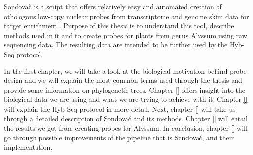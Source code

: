 Sondovač is a script that offers relatively easy and automated creation of othologous low-copy nuclear probes from 
transcriptome and genome skim data for target enrichment \cite{sondovac}. Purpose of this thesis is to understand 
this tool, describe methods used in it and to create probes for plants from genus Alyssum using raw sequencing data. 
The resulting data are intended to be further used by the Hyb-Seq protocol. 

In the first chapter, we will take a look at the biological motivation behind probe design and we will explain the most 
common terms used through the thesis and provide some information on phylogenetic trees. Chapter \ref{} offers insight 
into the biological data we are using and what we are trying to achieve with it. Chapter \ref{} will explain the Hyb-Seq 
protocol in more detail. Next, chapter \ref{} will take us through a detailed description of Sondovač and its methods. 
Chapter \ref{} will entail the results we got from creating probes for Alyssum. In conclusion, chapter \ref{} will go 
through possible improvements of the pipeline that is Sondovač, and their implementation. 


